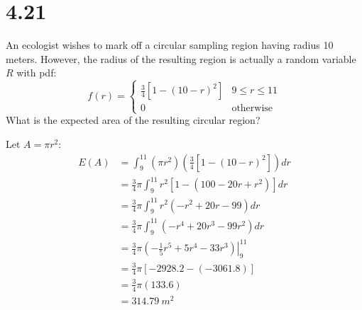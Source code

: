 \documentclass[letterpaper,12pt,fleqn]{article}
\begin{document}
\section*{4.21}

An ecologist wishes to mark off a circular sampling region having radius 10 meters.  However, the radius of the resulting
region is actually a random variable \(R\) with pdf:
\[f(r)=\begin{cases}
\frac{3}{4}[1-(10-r)^2] & 9\le r\le11 \\
0 & \text{otherwise}
\end{cases}\]
What is the expected area of the resulting circular region?

Let \(A=\pi r^2\):
\begin{align*}
  E(A) &= \int_9^{11}(\pi r^2)\left(\frac{3}{4}[1-(10-r)^2]\right)dr \\
  &= \frac{3}{4}\pi\int_9^{11}r^2[1-(100-20r+r^2)]dr \\
  &= \frac{3}{4}\pi\int_9^{11}r^2(-r^2+20r-99)dr \\
  &= \frac{3}{4}\pi\int_9^{11}(-r^4+20r^3-99r^2)dr \\
  &= \left.\frac{3}{4}\pi\left(-\frac{1}{5}r^5+5r^4-33r^3\right)\right|_9^{11} \\
  &= \frac{3}{4}\pi[-2928.2-(-3061.8)] \\
  &= \frac{3}{4}\pi(133.6) \\
  &= \SI{314.79}{m^2}
\end{align*}
\end{document}
